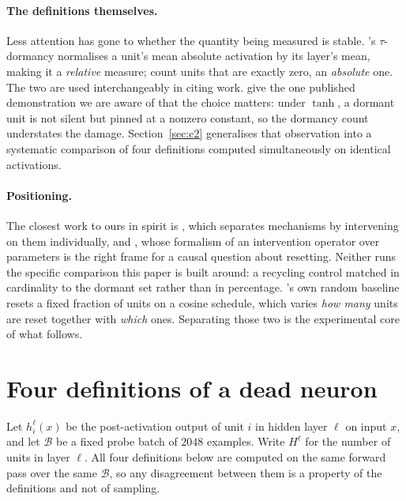 \documentclass[10pt]{article}
\begin{document}
\paragraph{The definitions themselves.}
Less attention has gone to whether the quantity being measured is stable.
\citet{sokar2023dormant}'s $\tau$-dormancy normalises a unit's mean absolute
activation by its layer's mean, making it a \emph{relative} measure;
\citet{dohare2024loss} count units that are exactly zero, an \emph{absolute}
one. The two are used interchangeably in citing work. \citet{kooi2024hadamard}
give the one published demonstration we are aware of that the choice matters:
under $\tanh$, a dormant unit is not silent but pinned at a nonzero constant, so
the dormancy count understates the damage. Section~\ref{sec:c2} generalises that
observation into a systematic comparison of four definitions computed
simultaneously on identical activations.

\paragraph{Positioning.}
The closest work to ours in spirit is \citet{lyle2024disentangling}, which
separates mechanisms by intervening on them individually, and
\citet{klein2024plasticity}, whose formalism of an intervention operator over
parameters is the right frame for a causal question about resetting. Neither
runs the specific comparison this paper is built around: a recycling control
matched in cardinality to the dormant set rather than in percentage.
\citet{sokar2023dormant}'s own random baseline resets a fixed fraction of units
on a cosine schedule, which varies \emph{how many} units are reset together with
\emph{which} ones. Separating those two is the experimental core of what
follows.

\section{Four definitions of a dead neuron}
\label{sec:defs}

Let $h^\ell_i(x)$ be the post-activation output of unit $i$ in hidden layer
$\ell$ on input $x$, and let $\mathcal{B}$ be a fixed probe batch of $2048$
examples. Write $H^\ell$ for the number of units in layer $\ell$. All four
definitions below are computed on the same forward pass over the same
$\mathcal{B}$, so any disagreement between them is a property of the
definitions and not of sampling.
\end{document}
